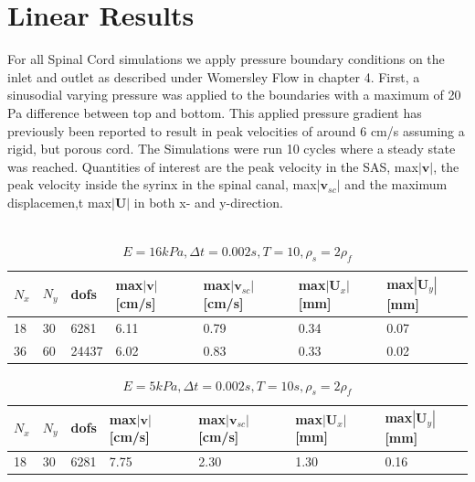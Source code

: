 \section{Linear Results}
For all Spinal Cord simulations we apply pressure boundary conditions on the inlet and outlet as described under Womersley Flow in chapter 4. First, a sinusodial varying pressure was applied to the boundaries with a maximum of 20 Pa difference between top and bottom. This applied pressure gradient has previously been reported to result in peak velocities of around 6 cm/s assuming a rigid, but porous cord. \cite{Dros11} The Simulations were run 10 cycles where a steady state was reached. Quantities of interest are the peak velocity in the SAS, max$|\mathbf{v}|$, the peak velocity inside the syrinx in the spinal canal, max$|\mathbf{v}_{sc}|$ and the maximum displacemen,t max$|\mathbf{U}|$ in both x- and y-direction.
\\
\\
\begin{table}[!ht]
\begin{center}
  \begin{tabular}{l | l | l | l | l | l | l }
    $N_x$ & $N_y$ & dofs & max$|\mathbf{v}|$[cm/s] & max$|\mathbf{v}_{sc}|$[cm/s] & max$|\mathbf{U}_x|$[mm] & max$|\mathbf{U}_y|$[mm] \\ \hline
    18  & 30 & 6281 & 6.11 & 0.79 & 0.34 & 0.07 \\ \hline
	36  & 60 & 24437 & 6.02 & 0.83 & 0.33 & 0.02 \\ \hline
    \hline
  \end{tabular}
  \end{center}
  \caption{$E = 16 kPa, \Delta t = 0.002s, T = 10, \rho_s = 2\rho_f$}
\end{table}

\begin{table}[!ht]
\begin{center}
  \begin{tabular}{l | l | l | l | l | l | l }
    $N_x$ & $N_y$ & dofs & max$|\mathbf{v}|$[cm/s] & max$|\mathbf{v}_{sc}|$[cm/s] & max$|\mathbf{U}_x|$[mm] & max$|\mathbf{U}_y|$[mm] \\ \hline
    18  & 30 & 6281 & 7.75 & 2.30 & 1.30 & 0.16 \\ \hline

    \hline
  \end{tabular}
  \end{center}
  \caption{$E = 5 kPa, \Delta t = 0.002s, T = 10s, \rho_s = 2\rho_f$}
\end{table}

